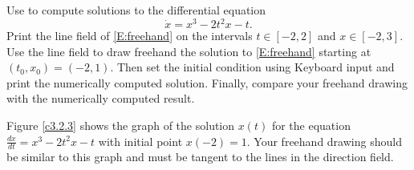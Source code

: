 \documentclass{ximera}
\begin{document}
\begin{computerExercise} \label{c3.2.3}
Use {\dfield} to compute solutions to the differential
equation
\begin{equation}  \label{E:freehand}
\dot{x} = x^3-2t^2x-t.
\end{equation}
Print the line field of \eqref{E:freehand} on the intervals
$t\in[-2,2]$ and $x\in[-2,3]$.  Use the line field to draw freehand
the solution to \eqref{E:freehand} starting at $(t_0,x_0)=(-2,1)$.
Then set the initial condition using {\sf Keyboard input}
and print the numerically computed solution. Finally, compare
your freehand drawing with the numerically computed result.

\begin{solution}

Figure \ref{c3.2.3} shows the graph of the solution $x(t)$ for the
equation $\frac{dx}{dt} = x^3 - 2t^2x - t$ with initial point $x(-2) = 1$.
Your freehand drawing should be similar to this graph and must be
tangent to the lines in the direction field.

\begin{figure}[htb]
                       \centerline{%
                       }
\end{figure}

\end{solution}
\end{computerExercise}
\end{document}
